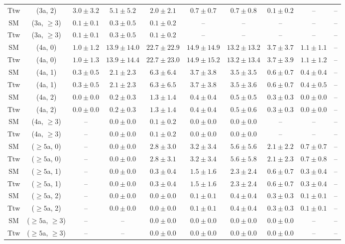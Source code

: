 \begin{table}[h!]
{\begin{tabular}{cccccccccc}
	Ttw & (3a, 2) & $3.0\pm 3.2$ & $5.1\pm 5.2$ & $2.0\pm 2.1$ & $0.7\pm 0.7$ & $0.7\pm 0.8$ & $0.1\pm 0.2$ & -- & -- \\[0.5ex] 
	SM & (3a, $\ge3$) & $0.1\pm 0.1$ & $0.3\pm 0.5$ & $0.1\pm 0.2$ & -- & -- & -- & -- & -- \\[0.5ex] 
	Ttw & (3a, $\ge3$) & $0.1\pm 0.1$ & $0.3\pm 0.5$ & $0.1\pm 0.2$ & -- & -- & -- & -- & -- \\[0.5ex] 
	SM & (4a, 0) & $1.0\pm 1.2$ & $13.9\pm 14.0$ & $22.7\pm 22.9$ & $14.9\pm 14.9$ & $13.2\pm 13.2$ & $3.7\pm 3.7$ & $1.1\pm 1.1$ & -- \\[0.5ex] 
	Ttw & (4a, 0) & $1.0\pm 1.3$ & $13.9\pm 14.4$ & $22.7\pm 23.0$ & $14.9\pm 15.2$ & $13.2\pm 13.4$ & $3.7\pm 3.9$ & $1.1\pm 1.2$ & -- \\[0.5ex] 
	SM & (4a, 1) & $0.3\pm 0.5$ & $2.1\pm 2.3$ & $6.3\pm 6.4$ & $3.7\pm 3.8$ & $3.5\pm 3.5$ & $0.6\pm 0.7$ & $0.4\pm 0.4$ & -- \\[0.5ex] 
	Ttw & (4a, 1) & $0.3\pm 0.5$ & $2.1\pm 2.3$ & $6.3\pm 6.5$ & $3.7\pm 3.8$ & $3.5\pm 3.6$ & $0.6\pm 0.7$ & $0.4\pm 0.5$ & -- \\[0.5ex] 
	SM & (4a, 2) & $0.0\pm 0.0$ & $0.2\pm 0.3$ & $1.3\pm 1.4$ & $0.4\pm 0.4$ & $0.5\pm 0.5$ & $0.3\pm 0.3$ & $0.0\pm 0.0$ & -- \\[0.5ex] 
	Ttw & (4a, 2) & $0.0\pm 0.0$ & $0.2\pm 0.3$ & $1.3\pm 1.4$ & $0.4\pm 0.4$ & $0.5\pm 0.6$ & $0.3\pm 0.3$ & $0.0\pm 0.0$ & -- \\[0.5ex] 
	SM & (4a, $\ge3$) & -- & $0.0\pm 0.0$ & $0.1\pm 0.2$ & $0.0\pm 0.0$ & $0.0\pm 0.0$ & -- & -- & -- \\[0.5ex] 
	Ttw & (4a, $\ge3$) & -- & $0.0\pm 0.0$ & $0.1\pm 0.2$ & $0.0\pm 0.0$ & $0.0\pm 0.0$ & -- & -- & -- \\[0.5ex] 
	SM & ($\ge5$a, 0) & -- & $0.0\pm 0.0$ & $2.8\pm 3.0$ & $3.2\pm 3.4$ & $5.6\pm 5.6$ & $2.1\pm 2.2$ & $0.7\pm 0.7$ & -- \\[0.5ex] 
	Ttw & ($\ge5$a, 0) & -- & $0.0\pm 0.0$ & $2.8\pm 3.1$ & $3.2\pm 3.4$ & $5.6\pm 5.8$ & $2.1\pm 2.3$ & $0.7\pm 0.8$ & -- \\[0.5ex] 
	SM & ($\ge5$a, 1) & -- & $0.0\pm 0.0$ & $0.3\pm 0.4$ & $1.5\pm 1.6$ & $2.3\pm 2.4$ & $0.6\pm 0.7$ & $0.3\pm 0.4$ & -- \\[0.5ex] 
	Ttw & ($\ge5$a, 1) & -- & $0.0\pm 0.0$ & $0.3\pm 0.4$ & $1.5\pm 1.6$ & $2.3\pm 2.4$ & $0.6\pm 0.7$ & $0.3\pm 0.4$ & -- \\[0.5ex] 
	SM & ($\ge5$a, 2) & -- & $0.0\pm 0.0$ & $0.0\pm 0.0$ & $0.1\pm 0.1$ & $0.4\pm 0.4$ & $0.3\pm 0.3$ & $0.1\pm 0.1$ & -- \\[0.5ex] 
	Ttw & ($\ge5$a, 2) & -- & $0.0\pm 0.0$ & $0.0\pm 0.0$ & $0.1\pm 0.1$ & $0.4\pm 0.4$ & $0.3\pm 0.3$ & $0.1\pm 0.1$ & -- \\[0.5ex] 
	SM & ($\ge5$a, $\ge3$) & -- & -- & $0.0\pm 0.0$ & $0.0\pm 0.0$ & $0.0\pm 0.0$ & $0.0\pm 0.0$ & -- & -- \\[0.5ex] 
	Ttw & ($\ge5$a, $\ge3$) & -- & -- & $0.0\pm 0.0$ & $0.0\pm 0.0$ & $0.0\pm 0.0$ & $0.0\pm 0.0$ & -- & -- \\[0.5ex] 
	\hline
	\hline
\end{tabular}}
\end{table}
